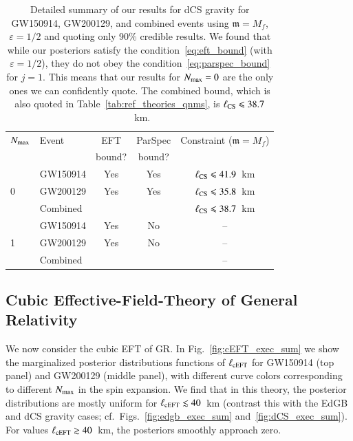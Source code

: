 \documentclass[twocolumn,
               prd,
               aps,
               superscriptaddress,
               tightenlines,
               nofootinbib,
               eqsecnum,
               amsfonts,
               amsmath,
               longbibliography]{revtex4-1}
\newcommand{\gm}{\mathfrak{m}}
\begin{document}
\begin{table}[h]
\begin{tabular}{l l c c c}
\hline
\hline
$N_{\rm max}$ & Event & EFT    & ParSpec & Constraint ($\gm = M_{f}$) \\
              &       & bound? & bound?  &                            \\
\hline
      & GW150914 & Yes & Yes & $\ell_{\rm CS} \leqslant 41.9$~km \\
0     & GW200129 & Yes & Yes & $\ell_{\rm CS} \leqslant 35.8$~km \\
      & Combined &     &     & \cellcolor{black!10}$\ell_{\rm CS} \leqslant 38.7$~km \\
\hline
      & GW150914 & Yes & No  & --                                 \\
1     & GW200129 & Yes & No  & --                                 \\
      & Combined &     &     & --                                 \\
\hline
\hline
\end{tabular}
\caption{Detailed summary of our results for dCS gravity for GW150914, GW200129, and
combined events using $\gm = M_{f}$, $\varepsilon = 1/2$ and quoting only 90\% credible results.
%
We found that while our posteriors satisfy the condition~\eqref{eq:eft_bound} (with $\varepsilon = 1/2$),
they do not obey the condition~\eqref{eq:parspec_bound} for $j = 1$. This means
that our results for $N_{\rm max}=0$ are the only ones we can confidently quote.
%
The combined bound, which is also quoted in Table~\ref{tab:ref_theories_qnms},
is $\ell_{\rm CS} \leqslant 38.7$~km.
}
\label{tab:summary_dcs}
\end{table}

\subsection{Cubic Effective-Field-Theory of General Relativity}
\label{sec:results_ceft}

We now consider the cubic EFT of GR.
%
In Fig.~\ref{fig:cEFT_exec_sum} we show the marginalized posterior distributions
functions of $\ell_{\rm cEFT}$ for GW150914 (top panel) and GW200129 (middle panel),
with different curve colors corresponding to different $N_{\rm max}$ in
the spin expansion.
%
We find that in this theory, the posterior distributions are mostly uniform for
$\ell_{\rm cEFT} \lesssim 40$~km (contrast this with the EdGB and dCS gravity
cases; cf.~Figs.~\ref{fig:edgb_exec_sum} and~\ref{fig:dCS_exec_sum}).
%
For values $\ell_{\rm cEFT} \gtrsim 40$~km, the posteriors smoothly approach zero.
\end{document}
